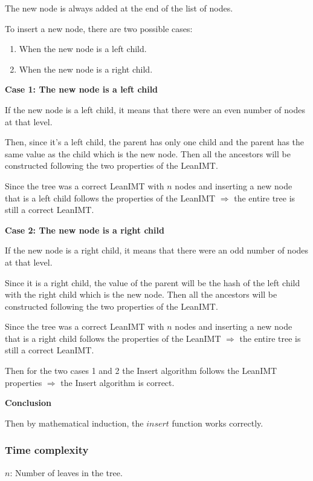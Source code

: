 \documentclass{article}
\begin{document}
The new node is always added at the end of the list of nodes.

To insert a new node, there are two possible cases:

\begin{enumerate}
    \item When the new node is a left child.
    \item When the new node is a right child.
\end{enumerate}

\textbf{Case 1: The new node is a left child}

If the new node is a left child, it means that there were an even number of nodes at that level.

Then, since it's a left child, the parent has only one child and the parent has the same value as the child which is the new node. Then all the ancestors will be constructed following the two properties of the LeanIMT.

Since the tree was a correct LeanIMT with $n$ nodes and inserting a new node that is a left child follows the properties of the LeanIMT $\Rightarrow$ the entire tree is still a correct LeanIMT.

\textbf{Case 2: The new node is a right child}

If the new node is a right child, it means that there were an odd number of nodes at that level.

Since it is a right child, the value of the parent will be the hash of the left child with the right child which is the new node. Then all the ancestors will be constructed following the two properties of the LeanIMT.

Since the tree was a correct LeanIMT with $n$ nodes and inserting a new node that is a right child follows the properties of the LeanIMT $\Rightarrow$ the entire tree is still a correct LeanIMT.

Then for the two cases 1 and 2 the Insert algorithm follows the LeanIMT properties $\Rightarrow$ the Insert algorithm is correct.

\textbf{Conclusion}

Then by mathematical induction, the $insert$ function works correctly.

\subsubsection{Time complexity}



$n$: Number of leaves in the tree.
\end{document}
